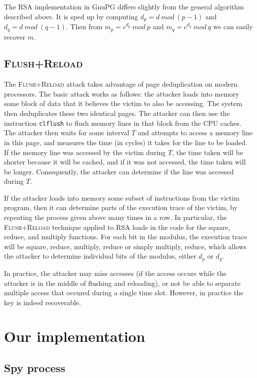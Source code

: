 \documentclass[11pt]{llncs}
\newcommand{\flushreload}{\textsc{Flush}+\textsc{Reload}}
\begin{document}
The RSA implementation in GnuPG differs slightly from the general algorithm
described above. It is sped up by computing $d_p = d\ mod\ (p-1)$ and $d_q = d\
mod\ (q-1)$. Then from $m_p = c^{d_p}\ mod\ p$ and $m_q = c^{d_q}\ mod\ q$ we
can easily recover $m$.

\subsection{\flushreload{}}

The \flushreload{} attack takes advantage of page deduplication on modern
processors. The basic attack works as follows: the attacker loads into memory
some block of data that it believes the victim to also be accessing. The system
then deduplicates these two identical pages. The attacker can then use the
instruction \texttt{clflush} to flush memory lines in that block from the CPU caches. The
attacker then waits for some interval $T$ and attempts to access a memory line
in this page, and measures the time (in cycles) it takes for the line to be
loaded. If the memory line was accessed by the victim during $T$, the time taken
will be shorter because it will be cached, and if it was not accessed, the time taken will be longer.
Consequently, the attacker can determine if the line was accessed during $T$.

If the attacker loads into memory some subset of instructions from the victim
program, then it can determine parts of the execution trace of the victim, by
repeating the process given above many times in a row. In particular, the
\flushreload{} technique applied to RSA loads in the code for the square,
reduce, and multiply functions. For each bit in the modulus, the execution trace
will be square, reduce, multiply, reduce or simply multiply, reduce, which
allows the attacker to determine individual bits of the modulus, either $d_p$ or
$d_q$.

In practice, the attacker may miss accesses (if the access occurs while the
attacker is in the middle of flushing and reloading), or not be able to separate
multiple access that occured during a single time slot. However, in practice the
key is indeed recoverable.

\section{Our implementation}

\subsection{Spy process}
\end{document}
